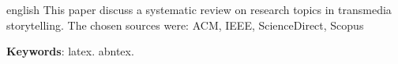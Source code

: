 \documentclass[
article,			%
11pt,				%
oneside,			%
a4paper,			%
english,			%
brazil,				%
sumario=tradicional
]{abntex2}
\begin{document}
  \renewcommand{\resumoname}{Abstract}
  \begin{resumoumacoluna}
    \begin{otherlanguage*}{english}
      This paper discuss a systematic review on research topics in transmedia storytelling. The chosen sources were: ACM, IEEE, ScienceDirect, Scopus

      \vspace{\onelineskip}

      \noindent
      \textbf{Keywords}: latex. abntex.
    \end{otherlanguage*}
  \end{resumoumacoluna}


  
\end{document}
